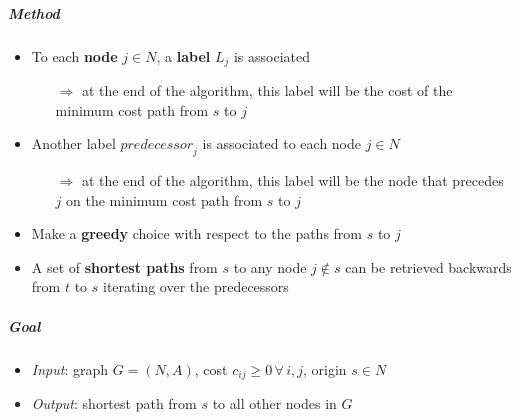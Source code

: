 \documentclass[english]{article}
\begin{document}
\subparagraph*{Method}
\begin{itemize}
  \item To each \textbf{node} \(j \in N\), a \textbf{label} \(L_j\) is associated
        \begin{itemize}
          \item[\(\Rightarrow\)] at the end of the algorithm, this label will be the cost of the minimum cost path from \(s\) to \(j\)
        \end{itemize}
  \item Another label \(\textit{predecessor}_j\) is associated to each node \(j \in N\)
        \begin{itemize}
          \item[\(\Rightarrow\)] at the end of the algorithm, this label will be the node that precedes \(j\) on the minimum cost path from \(s\) to \(j\)
        \end{itemize}
  \item Make a \textbf{greedy} choice with respect to the paths from \(s\) to \(j\)
  \item A set of \textbf{shortest paths} from \(s\) to any node \(j \notin s\) can be retrieved backwards from \(t\) to \(s\) iterating over the predecessors
\end{itemize}

\subparagraph*{Goal}
\begin{itemize}[label=\(\rightarrow\)]
  \item \textit{Input}: graph \(G = (N, A)\), cost \(c_{ij} \geq 0 \, \forall \, i, j\), origin \(s \in N\)
  \item \textit{Output}: shortest path from \(s\) to all other nodes in \(G\)
\end{itemize}
\end{document}
